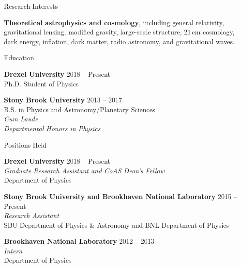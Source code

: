 \documentclass{resume} %
\begin{document}


\begin{rSection}{Research Interests}

\textbf{Theoretical astrophysics and cosmology}, including general relativity, gravitational lensing, modified gravity, large-scale structure, 21$\,$cm cosmology, dark energy, inflation, dark matter, radio astronomy, and gravitational waves. 

\end{rSection}


\begin{rSection}{Education}

\textbf{Drexel University} \hfill {2018 -- Present} \\ 
Ph.D. Student of Physics

\textbf{Stony Brook University} \hfill {2013 -- 2017} \\
B.S. in Physics and Astronomy/Planetary Sciences\\
\textit{Cum Laude}\\
\textit{Departmental Honors in Physics}

\end{rSection}


\begin{rSection}{Positions Held}

\textbf{Drexel University} \hfill {2018 -- Present} \\
\textit{Graduate Research Assistant and CoAS Dean's Fellow}\\
Department of Physics

\textbf{Stony Brook University and Brookhaven National Laboratory} \hfill {2015 -- Present}\\
\textit{Research Assistant}\\
SBU Department of Physics \& Astronomy  and BNL Department of Physics

\textbf{Brookhaven National Laboratory} \hfill {2012 -- 2013}\\
\textit{Intern}\\
Department of Physics

\end{rSection}
\end{document}
